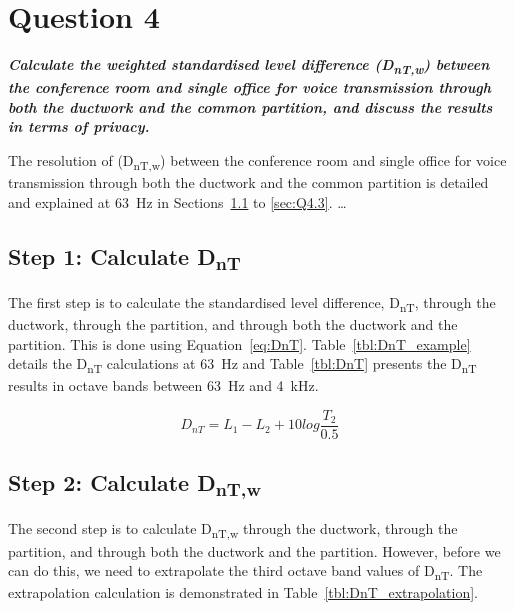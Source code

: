 \section{Question 4}

\textbf{\textit{Calculate the weighted standardised level difference (D\textsubscript{nT,w}) between the conference room and single office for voice transmission through both the ductwork and the common partition, and discuss the results in terms of privacy.}}



The resolution of (D\textsubscript{nT,w}) between the conference room and single office for voice transmission through both the ductwork and the common partition is detailed and explained at 63~Hz in Sections~\ref{sec:Q4.1} to \ref{sec:Q4.3}.
\ldots



\subsection{Step 1: Calculate D\textsubscript{nT}} \label{sec:Q4.1}

The first step is to calculate the standardised level difference, D\textsubscript{nT}, through the ductwork, through the partition, and through both the ductwork and the partition.
This is done using Equation~\ref{eq:DnT}.
Table~\ref{tbl:DnT_example} details the D\textsubscript{nT} calculations at 63~Hz and Table~\ref{tbl:DnT} presents the D\textsubscript{nT} results in octave bands between 63~Hz and 4~kHz.

	\begin{equation}\label{eq:DnT}
		D_{nT} = L_1 - L_2 + 10 log \frac{T_2}{0.5}
	\end{equation}







\subsection{Step 2: Calculate D\textsubscript{nT,w}} \label{sec:Q4.2}

The second step is to calculate D\textsubscript{nT,w} through the ductwork, through the partition, and through both the ductwork and the partition.
However, before we can do this, we need to extrapolate the third octave band values of D\textsubscript{nT}.
The extrapolation calculation is demonstrated in Table~\ref{tbl:DnT_extrapolation}.

